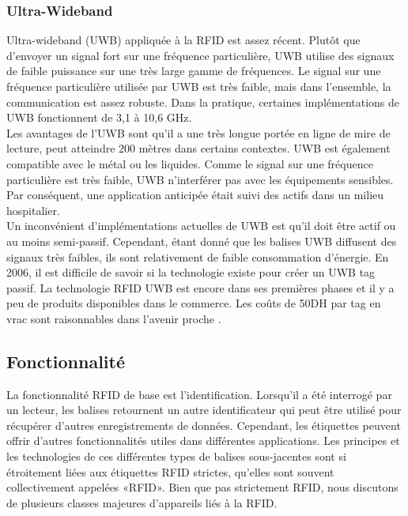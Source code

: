 \documentclass[11pt, a4paper, twoside]{book}
\begin{document}
\subsubsection{Ultra-Wideband}
Ultra-wideband (UWB) appliquée à la RFID est assez récent. Plutôt que d'envoyer un signal fort sur une fréquence particulière, UWB utilise des signaux de faible puissance sur une très large gamme de fréquences. Le signal sur une fréquence particulière utilisée par UWB est très faible, mais dans l'ensemble, la communication est assez robuste. Dans la pratique, certaines implémentations de UWB fonctionnent de 3,1 à 10,6 GHz.\\

Les avantages de l'UWB sont qu'il a une très longue portée en ligne de mire de lecture, peut atteindre 200 mètres dans certains contextes. UWB est également compatible avec le métal ou les liquides. Comme le signal sur une fréquence particulière est très faible, UWB n'interférer pas avec les équipements sensibles. Par conséquent, une application anticipée était suivi des actifs dans un milieu hospitalier.\\

Un inconvénient d'implémentations actuelles de UWB est qu'il doit être actif ou au moins semi-passif. Cependant, étant donné que les balises UWB diffusent des signaux très faibles, ils sont relativement de faible consommation d'énergie. En 2006, il est difficile de savoir si la technologie existe pour créer un UWB tag passif.
La technologie RFID UWB est encore dans ses premières phases et il y a peu de produits disponibles dans le commerce. Les coûts de 50DH par tag en vrac sont raisonnables dans l'avenir proche .
\subsection{Fonctionnalité}
La fonctionnalité RFID de base est l'identification. Lorsqu'il a été interrogé par un lecteur, les balises retournent un autre identificateur qui peut être utilisé pour récupérer d'autres enregistrements de données. Cependant, les étiquettes peuvent offrir d'autres fonctionnalités utiles dans différentes applications. Les principes et les technologies de ces différentes types de balises sous-jacentes sont si étroitement liées aux étiquettes RFID strictes, qu'elles sont souvent collectivement appelées «RFID». Bien que pas strictement RFID, nous discutons de plusieurs classes majeures d'appareils liés à la RFID.\\
\end{document}
